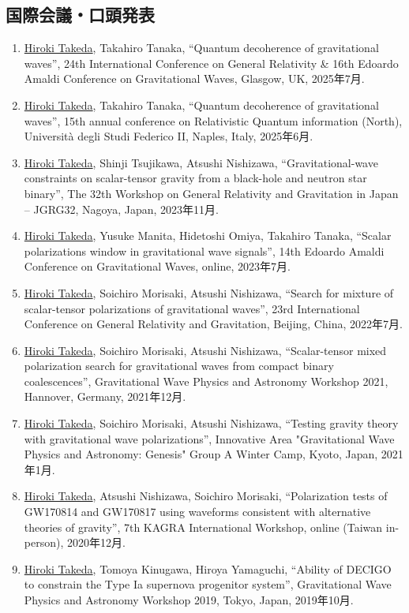 \documentclass[uplatex, 11pt]{jsarticle}
\begin{document}
\subsection*{国際会議・口頭発表}
\begin{enumerate}
\item \uline{Hiroki Takeda}, Takahiro Tanaka, “Quantum decoherence of gravitational waves”, 24th International Conference on General Relativity 
& 16th Edoardo Amaldi Conference on Gravitational Waves, Glasgow, UK, 2025年7月.
\item \uline{Hiroki Takeda}, Takahiro Tanaka, “Quantum decoherence of gravitational waves”, 15th annual conference on Relativistic Quantum information (North),
Università degli Studi Federico II, Naples, Italy, 2025年6月.
\item \uline{Hiroki Takeda}, Shinji Tsujikawa, Atsushi Nishizawa, “Gravitational-wave constraints on scalar-tensor gravity from a black-hole and neutron star binary”, The 32th Workshop on General Relativity and Gravitation in Japan – JGRG32, Nagoya, Japan, 2023年11月.
\item \uline{Hiroki Takeda}, Yusuke Manita, Hidetoshi Omiya, Takahiro Tanaka, “Scalar polarizations window in gravitational wave signals”, 14th Edoardo Amaldi Conference on Gravitational Waves, online, 2023年7月.
\item \uline{Hiroki Takeda}, Soichiro Morisaki, Atsushi Nishizawa, “Search for mixture of scalar-tensor polarizations of gravitational waves”, 23rd International Conference on General Relativity and Gravitation, Beijing, China, 2022年7月.
\item \uline{Hiroki Takeda}, Soichiro Morisaki, Atsushi Nishizawa, “Scalar-tensor mixed polarization search for gravitational waves from compact binary coalescences”, Gravitational Wave Physics and Astronomy Workshop 2021, Hannover, Germany, 2021年12月.
\item \uline{Hiroki Takeda}, Soichiro Morisaki, Atsushi Nishizawa, “Testing gravity theory with gravitational wave polarizations”, Innovative Area "Gravitational Wave Physics and Astronomy: Genesis" Group A Winter Camp, Kyoto, Japan, 2021年1月.
\item \uline{Hiroki Takeda}, Atsushi Nishizawa, Soichiro Morisaki, “Polarization tests of GW170814 and GW170817 using waveforms consistent with alternative theories of gravity”, 7th KAGRA International Workshop, online (Taiwan in-person), 2020年12月.
\item \uline{Hiroki Takeda}, Tomoya Kinugawa, Hiroya Yamaguchi, “Ability of DECIGO to constrain the Type Ia supernova progenitor system”, Gravitational Wave Physics and Astronomy Workshop 2019, Tokyo, Japan, 2019年10月.

\end{enumerate}
\end{document}
